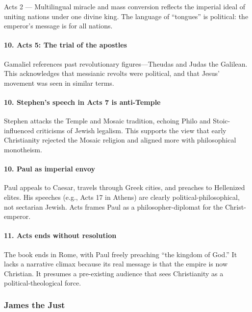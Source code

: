 Acts 2 --- Multilingual miracle and mass conversion reflects the imperial ideal of uniting nations under one divine king.
The language of ``tongues'' is political: the emperor's message is for all nations.

\paragraph{10.
Acts 5: The trial of the apostles}\label{par:acts-5-the-trial-of-the-apostles}

Gamaliel references past revolutionary figures---Theudas and Judas the Galilean.
This acknowledges that messianic revolts were political, and that Jesus' movement was seen in similar terms.

\paragraph{10.
Stephen's speech in Acts 7 is anti-Temple}\label{par:stephens-speech-in-acts-7-is-anti-temple}

Stephen attacks the Temple and Mosaic tradition, echoing Philo and Stoic-influenced criticisms of Jewish legalism.
This supports the view that early Christianity rejected the Mosaic religion and aligned more with philosophical monotheism.

\paragraph{10.
Paul as imperial envoy}\label{par:paul-as-imperial-envoy}

Paul appeals to Caesar, travels through Greek cities, and preaches to Hellenized elites.
His speeches (e.g., Acts 17 in Athens) are clearly political-philosophical, not sectarian Jewish.
Acts frames Paul as a philosopher-diplomat for the Christ-emperor.

\paragraph{11.
Acts ends without resolution}\label{par:acts-ends-without-resolution}

The book ends in Rome, with Paul freely preaching ``the kingdom of God.''
It lacks a narrative climax because its real message is that the empire is now Christian.
It presumes a pre-existing audience that sees Christianity as a political-theological force.

\subsubsection{James the Just}\label{par:james-the-just}

